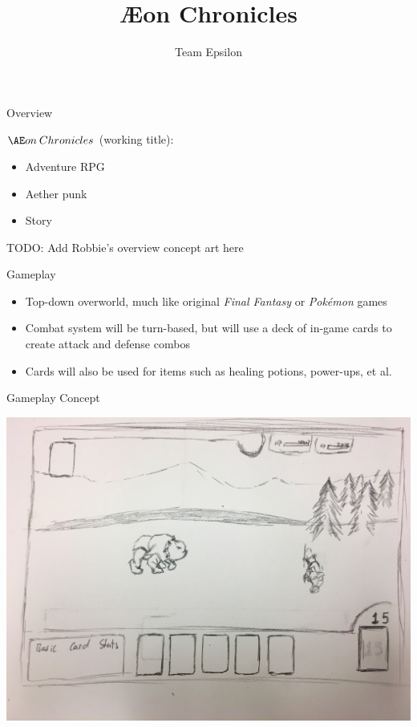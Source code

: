 \documentclass{teamepsilon}
\title{{\AE}on Chronicles}
\author{Team Epsilon}
\institute{Colorado School of Mines}
\begin{document}
\begin{frame}{Overview}
    \begin{minipage}{0.55\textwidth}
        $\AE on\:Chronicles$ (working title):
        \begin{itemize}
            \item Adventure RPG
            \item Aether punk
            \item Story
        \end{itemize}
    \end{minipage}%
    \begin{minipage}{0.45\textwidth}
        TODO: Add Robbie's overview concept art here
    \end{minipage}
\end{frame}

\begin{frame}{Gameplay}
    \begin{itemize}
        \item Top-down overworld, much like original \textit{Final Fantasy}
            or \textit{Pok\'emon} games
        \item Combat system will be turn-based, but will use a deck of in-game
            cards to create attack and defense combos
        \item Cards will also be used for items such as healing potions,
            power-ups, et al.
    \end{itemize}
\end{frame}

\begin{frame}{Gameplay Concept}
    \begin{minipage}{0.65\textwidth}
        \includegraphics[height=\textheight-3em]{../graphics/combat}
    \end{minipage}%
\end{frame}
\end{document}
